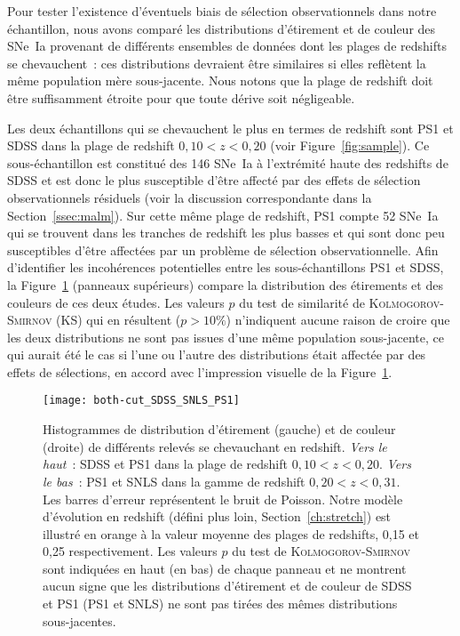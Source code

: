 \documentclass[../main/main.tex]{subfiles}
\begin{document}
Pour tester l'existence d'éventuels biais de sélection observationnels dans
notre échantillon, nous avons comparé les distributions d'étirement et de couleur
des SNe~Ia provenant de différents ensembles de données dont les plages de
redshifts se chevauchent~: ces distributions devraient être similaires si elles
reflètent la même population mère sous-jacente. Nous notons que la plage de
redshift doit être suffisamment étroite pour que toute dérive soit négligeable.

Les deux échantillons qui se chevauchent le plus en termes de redshift sont PS1
et SDSS dans la plage de redshift $0,10 < z < 0,20$ (voir
Figure~\ref{fig:sample}). Ce sous-échantillon est constitué des 146 SNe~Ia à
l'extrémité haute des redshifts de SDSS et est donc le plus susceptible d'être
affecté par des effets de sélection observationnels résiduels (voir la
discussion correspondante dans la Section~\ref{ssec:malm}). Sur cette même plage
de redshift, PS1 compte 52 SNe~Ia qui se trouvent dans les tranches de redshift
les plus basses et qui sont donc peu susceptibles d'être affectées par un
problème de sélection observationnelle. Afin d'identifier les incohérences
potentielles entre les sous-échantillons PS1 et SDSS, la Figure~\ref{fig:testvl}
(panneaux supérieurs) compare la distribution des étirements et des couleurs de
ces deux études. Les valeurs $p$ du test de similarité de
\textsc{Kolmogorov-Smirnov} (KS) qui en résultent ($p > 10\%$) n'indiquent
aucune raison de croire que les deux distributions ne sont pas issues d'une même
population sous-jacente, ce qui aurait été le cas si l'une ou l'autre des
distributions était affectée par des effets de sélections, en accord avec
l'impression visuelle de la Figure~\ref{fig:testvl}.

\begin{figure}[ht]
    \centering
    \texttt{[image: both-cut\_SDSS\_SNLS\_PS1]}
    \caption[Histogrammes de test de similarité de \textsc{Kolmogorov-Smirnov}
    entre les sondages SDSS et PS1 d'une part, PS1 et SNLS d'autre par, en
    étirement et en couleur]{Histogrammes de distribution d'étirement (gauche) et
        de couleur (droite) de différents relevés se chevauchant en redshift.
        \textit{Vers le haut}~: SDSS et PS1 dans la plage de redshift $0,10 < z
        < 0,20$. \textit{Vers le bas}~: PS1 et SNLS dans la gamme de redshift
        $0,20 < z < 0,31$. Les barres d'erreur représentent le bruit de Poisson.
        Notre modèle d'évolution en redshift (défini plus loin,
        Section~\ref{ch:stretch}) est illustré en orange à la valeur moyenne des
        plages de redshifts, 0,15 et 0,25 respectivement. Les valeurs $p$ du
        test de \textsc{Kolmogorov-Smirnov} sont indiquées en haut (en bas) de
        chaque panneau et ne montrent aucun signe que les distributions
        d'étirement et de couleur de SDSS et PS1 (PS1 et SNLS) ne sont pas
    tirées des mêmes distributions sous-jacentes.}
    \label{fig:testvl}
\end{figure}
\end{document}
